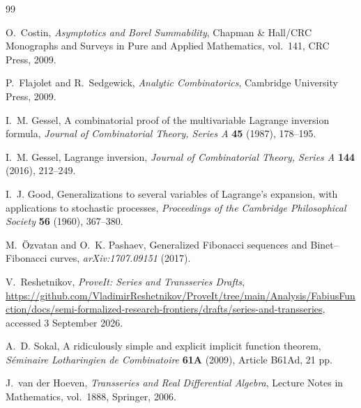 \documentclass[11pt,oneside]{article}
\theoremstyle{plain}
\theoremstyle{definition}
\theoremstyle{remark}
\begin{document}
\begin{thebibliography}{99}

O.~Costin,
\emph{Asymptotics and Borel Summability},
Chapman \& Hall/CRC Monographs and Surveys in Pure and Applied Mathematics,
vol.~141, CRC Press, 2009.

P.~Flajolet and R.~Sedgewick,
\emph{Analytic Combinatorics},
Cambridge University Press, 2009.

I.~M. Gessel,
A combinatorial proof of the multivariable Lagrange inversion formula,
\emph{Journal of Combinatorial Theory, Series A} \textbf{45} (1987),
178--195.

I.~M. Gessel,
Lagrange inversion,
\emph{Journal of Combinatorial Theory, Series A} \textbf{144} (2016),
212--249.

I.~J. Good,
Generalizations to several variables of Lagrange's expansion, with applications
to stochastic processes,
\emph{Proceedings of the Cambridge Philosophical Society} \textbf{56} (1960),
367--380.

M.~\"Ozvatan and O.~K. Pashaev,
Generalized Fibonacci sequences and Binet--Fibonacci curves,
\emph{arXiv:1707.09151} (2017).

V.~Reshetnikov,
\emph{ProveIt: Series and Transseries Drafts},
\url{https://github.com/VladimirReshetnikov/ProveIt/tree/main/Analysis/FabiusFunction/docs/semi-formalized-research-frontiers/drafts/series-and-transseries},
accessed 3 September 2026.

A.~D. Sokal,
A ridiculously simple and explicit implicit function theorem,
\emph{S\'eminaire Lotharingien de Combinatoire} \textbf{61A} (2009),
Article B61Ad, 21 pp.

J.~van der Hoeven,
\emph{Transseries and Real Differential Algebra},
Lecture Notes in Mathematics, vol.~1888, Springer, 2006.

\end{thebibliography}
\end{document}
